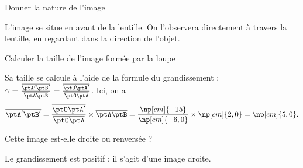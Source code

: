 


\begin{enonce}
Donner la nature de l'image
\end{enonce}


\begin{corrige}
L'image se situe en avant de la lentille. On l'observera directement à travers la lentille, en regardant dans la direction de l'objet.
\end{corrige}




\begin{enonce}
Calculer la taille de l'image formée par la loupe
\end{enonce}


\begin{corrige}
Sa taille se calcule à l'aide de la formule du grandissement : $\gamma=\frac{\overline{\ptA'\ptB'}}{\overline{\ptA\ptB}}=\frac{\overline{\ptO\ptA'}}{\overline{\ptO\ptA}}$. Ici, on a 
\[
\overline{\ptA'\ptB'}=\frac{\overline{\ptO\ptA'}}{\overline{\ptO\ptA}}\times\overline{\ptA\ptB}=\frac{\np[cm]{-15}}{\np[cm]{-6,0}}\times\np[cm]{2,0}=\np[cm]{5,0}.
\]
\end{corrige}




\begin{enonce}
Cette image est-elle droite ou renversée ?
\end{enonce}


\begin{corrige}
Le grandissement est positif : il s'agit d'une image droite.
\end{corrige}


